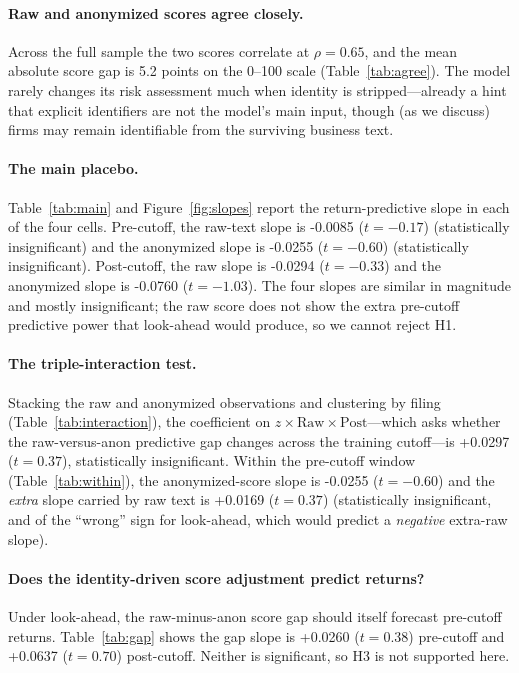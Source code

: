 \documentclass[12pt]{article}
\begin{document}
\paragraph{Raw and anonymized scores agree closely.} Across the full sample the two scores
correlate at $\rho=0.65$, and the mean absolute score gap is 5.2 points on the 0--100 scale
(Table~\ref{tab:agree}). The model rarely changes its risk assessment much when identity is
stripped---already a hint that explicit identifiers are not the model's main input, though
(as we discuss) firms may remain identifiable from the surviving business text.

\paragraph{The main placebo.} Table~\ref{tab:main} and Figure~\ref{fig:slopes} report the
return-predictive slope in each of the four cells. Pre-cutoff, the raw-text slope is -0.0085
($t=-0.17$) (statistically insignificant) and the anonymized slope is -0.0255 ($t=-0.60$)
(statistically insignificant). Post-cutoff, the raw slope is -0.0294 ($t=-0.33$) and the
anonymized slope is -0.0760 ($t=-1.03$). The four slopes are similar in magnitude and mostly
insignificant; the raw score does not show the extra pre-cutoff predictive power that
look-ahead would produce, so we cannot reject H1.

\paragraph{The triple-interaction test.} Stacking the raw and anonymized observations and
clustering by filing (Table~\ref{tab:interaction}), the coefficient on
$z\times\text{Raw}\times\text{Post}$---which asks whether the raw-versus-anon predictive gap
changes across the training cutoff---is +0.0297 ($t=0.37$), statistically insignificant.
Within the pre-cutoff window (Table~\ref{tab:within}), the anonymized-score slope is -0.0255
($t=-0.60$) and the \emph{extra} slope carried by raw text is +0.0169 ($t=0.37$)
(statistically insignificant, and of the ``wrong'' sign for look-ahead, which would predict a
\emph{negative} extra-raw slope).

\paragraph{Does the identity-driven score adjustment predict returns?} Under look-ahead, the
raw-minus-anon score gap should itself forecast pre-cutoff returns. Table~\ref{tab:gap} shows
the gap slope is +0.0260 ($t=0.38$) pre-cutoff and +0.0637 ($t=0.70$) post-cutoff. Neither is
significant, so H3 is not supported here.
\end{document}
